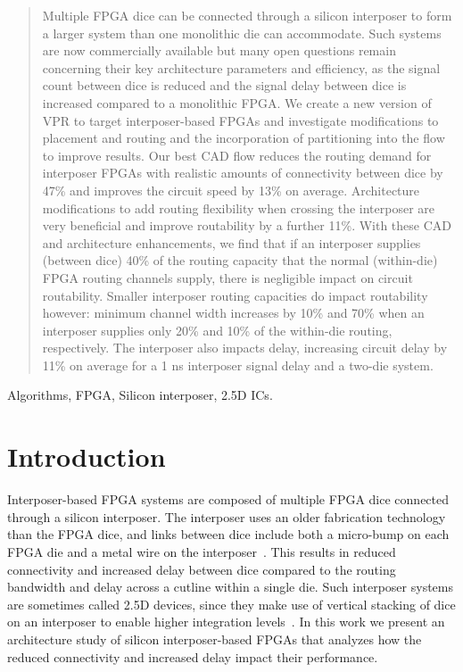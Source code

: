 \documentclass[journal]{IEEEtran}
\begin{document}
\begin{abstract}
Multiple FPGA dice can be connected through a silicon interposer to form a larger system than one monolithic die can accommodate. Such systems are now commercially available but many open questions remain concerning their key architecture parameters and efficiency, as the signal count between dice is reduced and the signal delay between dice is increased compared to a monolithic FPGA.
We create a new version of VPR to target interposer-based FPGAs and investigate modifications to placement and routing and the incorporation of partitioning into the flow to improve results. Our best CAD flow reduces the routing demand for interposer FPGAs with realistic amounts of connectivity between dice by 47\% and improves the circuit speed by 13\% on average. Architecture modifications to add routing flexibility when crossing the interposer are very beneficial and improve routability by a further 11\%. With these CAD and architecture enhancements, we find that if an interposer supplies (between dice) 40\% of the routing capacity that the normal (within-die) FPGA routing channels supply, there is negligible impact on circuit routability. Smaller interposer routing capacities do impact routability however: minimum channel width increases by 10\% and 70\% when an interposer supplies only 20\% and 10\% of the within-die routing, respectively. The interposer also impacts delay, increasing circuit delay by 11\% on average for a 1 ns interposer signal delay and a two-die system. 
\end{abstract}

\begin{IEEEkeywords}
Algorithms, FPGA, Silicon interposer, 2.5D ICs. 
\end{IEEEkeywords}



\section{Introduction}
\label{introSection} 
Interposer-based FPGA systems are composed of multiple FPGA dice connected through a silicon interposer. The interposer uses an older fabrication technology than the FPGA dice, and links between dice include both a micro-bump on each FPGA die and a metal wire on the interposer~\cite{xilinxTSVperformance}. This results in reduced connectivity and increased delay between dice compared to the routing bandwidth and delay across a cutline within a single die. Such interposer systems are sometimes called 2.5D devices, since they make use of vertical stacking of dice on an interposer to enable higher integration levels~\cite{3dhandbook}. In this work we present an architecture study of silicon interposer-based FPGAs that analyzes how the reduced connectivity and increased delay impact their performance.
\end{document}
